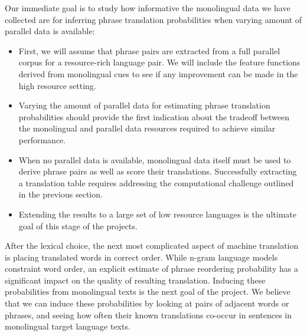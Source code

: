 \documentclass{article}
\begin{document}
Our immediate goal is to study how informative the monolingual data we have collected are for inferring phrase translation probabilities when varying amount of parallel data is available:

\begin{itemize}
  \item First, we will assume that phrase pairs are extracted from a full parallel corpus for a resource-rich language pair.  We will include the feature functions derived from monolingual cues to see if any improvement can be made in the high resource setting.
  \item Varying the amount of parallel data for estimating phrase translation probabilities should provide the first indication about the tradeoff between the monolingual and parallel data resources required to achieve similar performance.  
  \item When no parallel data is available, monolingual data itself must be used to derive phrase pairs as well as score their translations.  Successfully extracting a translation table requires addressing the computational challenge outlined in the previous section.
  \item Extending the results to a large set of low resource languages is the ultimate goal of this stage of the projects.\\
\end{itemize}

After the lexical choice, the next most complicated aspect of machine translation is placing translated words in correct order.  While n-gram language models constraint word order, an explicit estimate of phrase reordering probability has a significant impact on the quality of resulting translation.  Inducing these probabilities from monolingual texts is the next goal of the project.  We believe that we can induce these probabilities by looking at pairs of adjacent words or phrases, and seeing how often their known translations co-occur in sentences in monolingual target language texts.  




 
\end{document}
